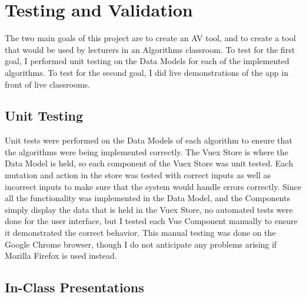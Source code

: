 \chapter{Testing and Validation}
\label{testing}
The two main goals of this project are to create an AV tool, and to create a tool 
that would be used by lecturers in an Algorithms classroom. 
To test for the first goal, I performed unit testing on the Data Models for 
each of the implemented algorithms.
To test for the second goal, I did live demonstrations of the app in front 
of live classrooms. 
\section{Unit Testing}
\hspace{-0.26in}
Unit tests were performed on the Data Models of each algorithm to ensure 
that the algorithms were being implemented correctly. 
The Vuex Store is where the Data Model is held, so each component of 
the Vuex Store was unit tested.
Each mutation and action in the store was tested with correct inputs as well as incorrect inputs
to make sure that the system would handle errors correctly. 
\newline\newline
Since all the functionality was implemented in the Data Model, and the 
Components simply display the data that is held in the Vuex Store, 
no automated tests were done for the user interface, but I tested each 
Vue Component manually to ensure it demonstrated the correct behavior. 
This manual testing was done on the Google Chrome browser, though I do not anticipate
any problems arising if Mozilla Firefox is used instead. 
\section{In-Class Presentations}
